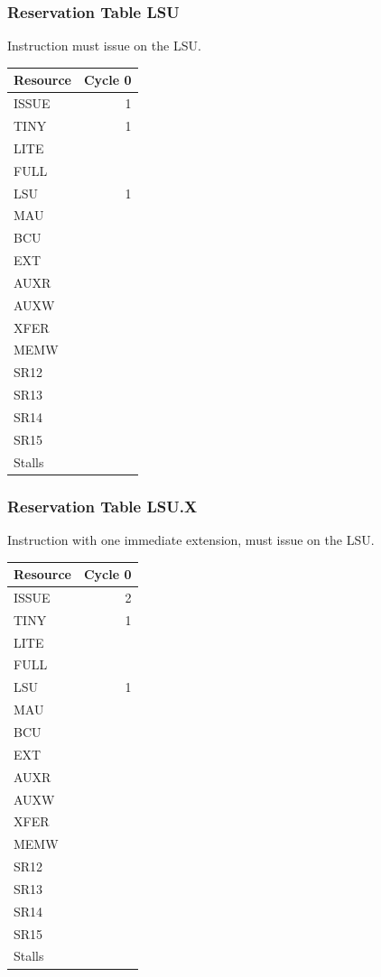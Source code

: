 \subsubsection{Reservation Table LSU} \label{sec:reservation-LSU}

Instruction must issue on the LSU.
\medskip

\begin{tabular}{|l|r|} \hline
Resource	& Cycle 0 \\ \hline
\textsf{ISSUE}	& 1	\\
\textsf{TINY}	& 1	\\
\textsf{LITE}	& 	\\
\textsf{FULL}	& 	\\
\textsf{LSU}	& 1	\\
\textsf{MAU}	& 	\\
\textsf{BCU}	& 	\\
\textsf{EXT}	& 	\\
\textsf{AUXR}	& 	\\
\textsf{AUXW}	& 	\\
\textsf{XFER}	& 	\\
\textsf{MEMW}	& 	\\
\textsf{SR12}	& 	\\
\textsf{SR13}	& 	\\
\textsf{SR14}	& 	\\
\textsf{SR15}	& 	\\
\hline Stalls	& 	\\
\hline \end{tabular}

\subsubsection{Reservation Table LSU.X} \label{sec:reservation-LSU.X}

Instruction with one immediate extension, must issue on the LSU.
\medskip

\begin{tabular}{|l|r|} \hline
Resource	& Cycle 0 \\ \hline
\textsf{ISSUE}	& 2	\\
\textsf{TINY}	& 1	\\
\textsf{LITE}	& 	\\
\textsf{FULL}	& 	\\
\textsf{LSU}	& 1	\\
\textsf{MAU}	& 	\\
\textsf{BCU}	& 	\\
\textsf{EXT}	& 	\\
\textsf{AUXR}	& 	\\
\textsf{AUXW}	& 	\\
\textsf{XFER}	& 	\\
\textsf{MEMW}	& 	\\
\textsf{SR12}	& 	\\
\textsf{SR13}	& 	\\
\textsf{SR14}	& 	\\
\textsf{SR15}	& 	\\
\hline Stalls	& 	\\
\hline \end{tabular}

